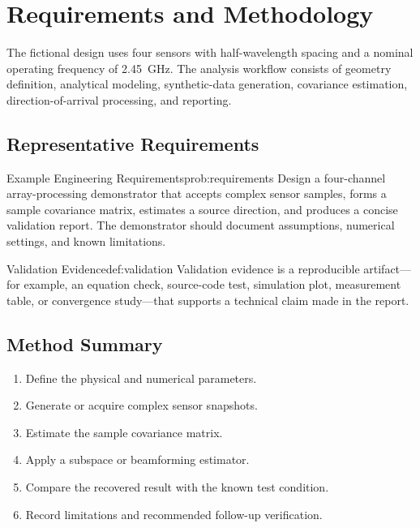 \section{Requirements and Methodology}

The fictional design uses four sensors with half-wavelength spacing and a nominal operating
frequency of \SI{2.45}{\giga\hertz}. The analysis workflow consists of geometry definition,
analytical modeling, synthetic-data generation, covariance estimation, direction-of-arrival
processing, and reporting.

\subsection{Representative Requirements}

\begin{problem}{Example Engineering Requirements}{prob:requirements}
Design a four-channel array-processing demonstrator that accepts complex sensor samples,
forms a sample covariance matrix, estimates a source direction, and produces a concise
validation report. The demonstrator should document assumptions, numerical settings, and
known limitations.
\end{problem}

\begin{definition}{Validation Evidence}{def:validation}
Validation evidence is a reproducible artifact---for example, an equation check, source-code
test, simulation plot, measurement table, or convergence study---that supports a technical
claim made in the report.
\end{definition}

\subsection{Method Summary}

\begin{enumerate}[label=\arabic*.]
    \item Define the physical and numerical parameters.
    \item Generate or acquire complex sensor snapshots.
    \item Estimate the sample covariance matrix.
    \item Apply a subspace or beamforming estimator.
    \item Compare the recovered result with the known test condition.
    \item Record limitations and recommended follow-up verification.
\end{enumerate}

